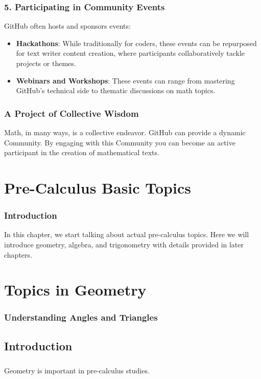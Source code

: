 \documentclass[a4paper,12pt]{book}
\begin{document}
\subsection*{5. Participating in Community Events}
GitHub often hosts and sponsors events:

\begin{itemize}
    \item \textbf{Hackathons}: While traditionally for coders, these events can be repurposed for text writer content creation, where participants collaboratively tackle projects or themes.
    \item \textbf{Webinars and Workshops}: These events can range from mastering GitHub's technical side to thematic discussions on math topics.
\end{itemize}

\subsection*{A Project of Collective Wisdom}
Math, in many ways, is a collective endeavor. GitHub can provide a dynamic Community. By engaging with this Community you can become an active participant in the creation of mathematical texts.

\chapter{Pre-Calculus Basic Topics}
\subsection*{Introduction}
In this chapter, we start talking about actual pre-calculus topics. Here we will introduce geometry, algebra, and trigonometry with details provided in later chapters.

\chapter{Topics in Geometry}
\subsection*{Understanding Angles and Triangles}

\section*{Introduction}
\paragraph{}
Geometry is important in pre-calculus studies.
\end{document}
